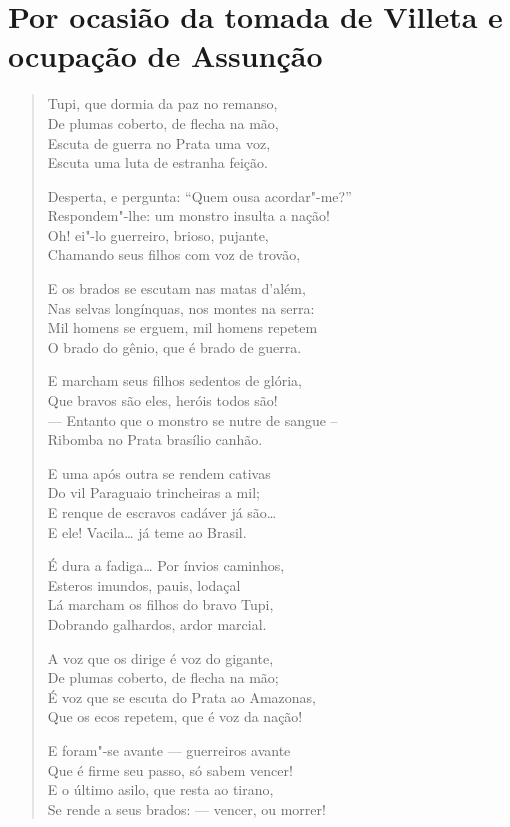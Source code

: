 \chapter{Por ocasião da tomada de Villeta e ocupação de Assunção}

\begin{verse}
Tupi, que dormia da paz no remanso,\\
De plumas coberto, de flecha na mão,\\
Escuta de guerra no Prata uma voz,\\
Escuta uma luta de estranha feição.

Desperta, e pergunta: ``Quem ousa acordar"-me?''\\
Respondem"-lhe: um monstro insulta a nação!\\
Oh! ei"-lo guerreiro, brioso, pujante,\\
Chamando seus filhos com voz de trovão,

E os brados se escutam nas matas d'além,\\
Nas selvas longínquas, nos montes na serra:\\
Mil homens se erguem, mil homens repetem\\
O brado do gênio, que é brado de guerra.

E marcham seus filhos sedentos de glória,\\
Que bravos são eles, heróis todos são!\\
--- Entanto que o monstro se nutre de sangue --\\
Ribomba no Prata brasílio canhão.

E uma após outra se rendem cativas\\
Do vil Paraguaio trincheiras a mil;\\
E renque de escravos cadáver já são\ldots{}\\
E ele! Vacila\ldots{} já teme ao Brasil.

É dura a fadiga\ldots{} Por ínvios caminhos,\\
Esteros imundos, pauis, lodaçal\\
Lá marcham os filhos do bravo Tupi,\\
Dobrando galhardos, ardor marcial.

A voz que os dirige é voz do gigante,\\
De plumas coberto, de flecha na mão;\\
É voz que se escuta do Prata ao Amazonas,\\
Que os ecos repetem, que é voz da nação!

E foram"-se avante --- guerreiros avante\\
Que é firme seu passo, só sabem vencer!\\
E o último asilo, que resta ao tirano,\\
Se rende a seus brados: --- vencer, ou morrer!


\end{verse}
